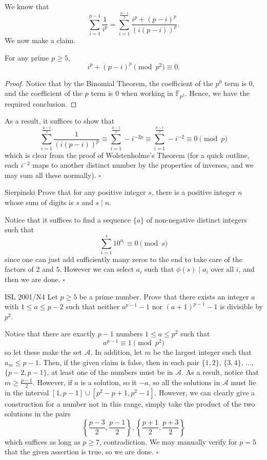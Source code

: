 \documentclass{article}
\begin{document}
We know that \[\sum_{i=1}^{p-1}\dfrac{1}{i^p} = \sum_{i=1}^{\tfrac{p-1}{2}}\dfrac{i^p+(p-i)^p}{(i(p-i))^p}.\] We now make a claim.
\begin{claim*}
For any prime $p \ge 5$, \[i^p + (p-i)^p \pmod{p^2} \equiv 0.\]
\end{claim*}
\begin{proof}
Notice that by the Binomial Theorem, the coefficient of the $p^0$ term is $0$, and the coefficient of the $p$ term is $0$ when working in $\mathbb{F}_{p^2}$. Hence, we have the required conclusion.
\end{proof}
As a result, it suffices to show that \[\sum_{i=1}^{\tfrac{p-1}{2}}\dfrac{1}{(i(p-i))^p} \equiv \sum_{i=1}^{\tfrac{p-1}{2}}-i^{-2p}\equiv \sum_{i=1}^{\tfrac{p-1}{2}}-i^{-2} \equiv 0 \pmod{p}\] which is clear from the proof of Wolstenholme's Theorem (for a quick outline, each $i^{-2}$ maps to another distinct number by the properties of inverses, and we may sum all these normally). $\square$

\begin{problem}[2.14.11]{Sierpinski}
Prove that for any positive integer $s$, there is a positive integer $n$ whose sum of digits is $s$ and $s \mid n$.
\end{problem}

Notice that it suffices to find a sequence $\{a\}$ of non-negative distinct integers such that \[\sum_{i=1}^{s} 10^{a_i} \equiv 0 \pmod{s}\] since one can just add sufficiently many zeros to the end to take care of the factors of $2$ and $5$. However we can select $a_i$ such that $\phi(s) \mid a_i$ over all $i$, and then we are done. $\square$

\begin{problem}[2.14.12]{ISL 2001/N4}
Let $p \ge 5$ be a prime number. Prove that there exists an integer $a$ with $1 \le a \le p - 2$ such that neither $a^{p-1} - 1$ nor $(a + 1)^{p-1} - 1$ is divisible by $p^2$.
\end{problem}

Notice that there are exactly $p-1$ numbers $1 \le a \le p^2$ such that \[a^{p-1} \equiv 1 \pmod{p^2}\] so let these make the set $\mathcal{A}$. In addition, let $m$ be the largest integer such that $a_m \le p-1$. Then, if the given claim is false, then in each pair $\{1, 2\}$, $\{3, 4\}$, $\dots$, $\{p-2, p-1\}$, at least one of the numbers must be in $\mathcal{A}$. As a result, notice that $m \ge \tfrac{p-1}{2}$. However, if $a$ is a solution, so it $-a$, so all the solutions in $\mathcal{A}$ must lie in the interval $[1, p-1] \cup [p^2-p+1, p^2-1]$. However, we can clearly give a construction for a number not in this range, simply take the product of the two solutions in the pairs \[\left\{\dfrac{p-3}{2}, \dfrac{p-1}{2}\right\}, \left\{\dfrac{p+1}{2}, \dfrac{p+3}{2}\right\}\] which suffices as long as $p \ge 7$, contradiction. We may manually verify for $p = 5$ that the given assertion is true, so we are done. $\square$
\end{document}
